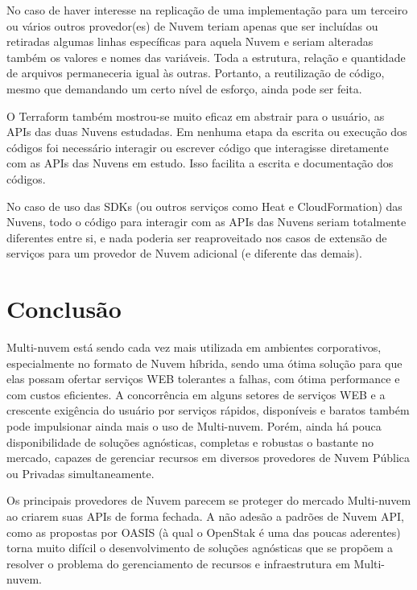 \documentclass[12pt]{article}
\begin{document}
	No caso de haver interesse na replicação de uma implementação para um terceiro ou vários outros provedor(es) de Nuvem teriam apenas que ser incluídas ou retiradas algumas linhas específicas para aquela Nuvem e seriam alteradas também os valores e nomes das variáveis. Toda a estrutura, relação e quantidade de arquivos permaneceria igual às outras. Portanto, a reutilização de código, mesmo que demandando um certo nível de esforço, ainda pode ser feita. 
	
	O Terraform também mostrou-se muito eficaz em abstrair para o usuário, as APIs das duas Nuvens estudadas. Em nenhuma etapa da escrita ou execução dos códigos foi necessário interagir ou escrever código que interagisse diretamente com as APIs das Nuvens em estudo. Isso facilita a escrita e documentação dos códigos.
	
	No caso de uso das SDKs (ou outros serviços como Heat e CloudFormation) das Nuvens, todo o código para interagir com as APIs das Nuvens seriam totalmente diferentes entre si, e nada poderia ser reaproveitado nos casos de extensão de serviços para um provedor de Nuvem adicional (e diferente das demais). 		
	
	\section{Conclusão}
	
	Multi-nuvem está sendo cada vez mais utilizada em ambientes corporativos, especialmente no formato de Nuvem híbrida, sendo uma ótima solução para que elas possam ofertar serviços WEB tolerantes a falhas, com ótima performance e com custos eficientes. A concorrência em alguns setores de serviços WEB e a crescente exigência do usuário por serviços rápidos, disponíveis e baratos também pode impulsionar ainda mais o uso de Multi-nuvem. Porém, ainda há pouca disponibilidade de soluções agnósticas, completas e robustas o bastante no mercado, capazes de gerenciar recursos em diversos provedores de Nuvem Pública ou Privadas simultaneamente.
	
	Os principais provedores de Nuvem parecem se proteger do mercado Multi-nuvem ao criarem suas APIs de forma fechada. A não adesão a padrões de Nuvem API, como as propostas por OASIS \cite{CAMP:2019} (à qual o OpenStak é uma das poucas aderentes) torna muito difícil o desenvolvimento de soluções agnósticas que se propõem a resolver o problema do gerenciamento de recursos e infraestrutura em Multi-nuvem.
		
\end{document}
